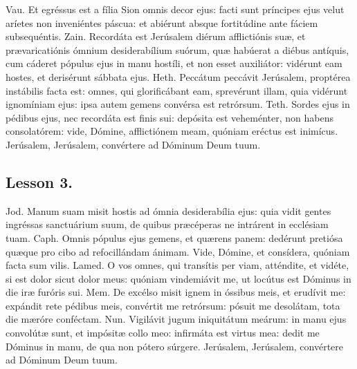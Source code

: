 
    Vau. Et egréssus est a fília Sion omnis decor ejus: facti sunt príncipes
    ejus velut aríetes non inveniéntes páscua: et abiérunt absque fortitúdine
    ante fáciem subsequéntis. Zain. Recordáta est Jerúsalem diérum afflictiónis
    suæ, et prævaricatiónis ómnium desiderabílium suórum, quæ habúerat a diébus
    antíquis, cum cáderet pópulus ejus in manu hostíli, et non esset
    auxiliátor: vidérunt eam hostes, et derisérunt sábbata ejus. Heth. Peccátum
    peccávit Jerúsalem, proptérea instábilis facta est: omnes, qui
    glorificábant eam, sprevérunt illam, quia vidérunt ignomíniam ejus: ipsa
    autem gemens convérsa est retrórsum. Teth. Sordes ejus in pédibus ejus, nec
    recordáta est finis sui: depósita est veheménter, non habens consolatórem:
    vide, Dómine, afflictiónem meam, quóniam eréctus est inimícus. Jerúsalem,
    Jerúsalem, convértere ad Dóminum Deum tuum.


    \subsection{Lesson 3.}


    Jod. Manum suam misit hostis ad ómnia desiderabília ejus: quia vidit
    gentes ingréssas sanctuárium suum, de quibus præcéperas ne intrárent in
    ecclésiam tuam. Caph. Omnis pópulus ejus gemens, et quærens panem:
    dedérunt pretiósa quæque pro cibo ad refocillándam ánimam. Vide,
    Dómine, et consídera, quóniam facta sum vilis. Lamed. O vos omnes, qui
    transítis per viam, atténdite, et vidéte, si est dolor sicut dolor
    meus: quóniam vindemiávit me, ut locútus est Dóminus in die iræ furóris
    sui. Mem. De excélso misit ignem in óssibus meis, et erudívit me:
    expándit rete pédibus meis, convértit me retrórsum: pósuit me
    desolátam, tota die mæróre conféctam. Nun. Vigilávit jugum iniquitátum
    meárum: in manu ejus convolútæ sunt, et impósitæ collo meo: infirmáta
    est virtus mea: dedit me Dóminus in manu, de qua non pótero súrgere.
    Jerúsalem, Jerúsalem, convértere ad Dóminum Deum tuum.


